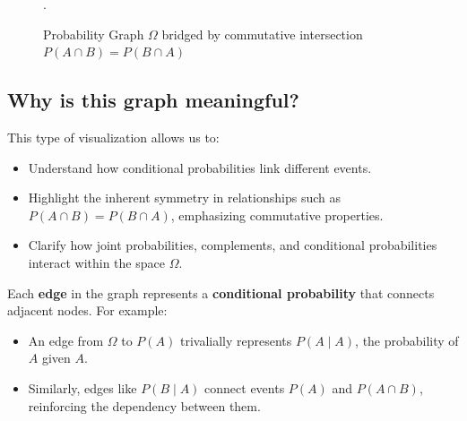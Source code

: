\documentclass[
  12 pt,
  a4paper,
]{book}
\providecommand{\tightlist}{%
  \setlength{\itemsep}{0pt}\setlength{\parskip}{0pt}}
\numberwithin{equation}{section}
\theoremstyle{plain}      %
\theoremstyle{definition} %
\theoremstyle{remark}     %
\theoremstyle{note}         %
\begin{document}
\begin{figure}[htbp]
{
}
\caption{Probability Graph $\Omega$ bridged by commutative intersection $P(A \cap B) = P(B \cap A)$}.
\label{fig:ProbGraph1-diagram}
\end{figure}

\hypertarget{why-is-this-graph-meaningful}{%
\subsection{Why is this graph
meaningful?}\label{why-is-this-graph-meaningful}}

This type of visualization allows us to:

\begin{itemize}
\tightlist
\item
  Understand how conditional probabilities link different events.
\item
  Highlight the inherent symmetry in relationships such as
  \(P(A \cap B) = P(B \cap A)\), emphasizing commutative properties.
\item
  Clarify how joint probabilities, complements, and conditional
  probabilities interact within the space \(\Omega\).
\end{itemize}

Each \textbf{edge} in the graph represents a \textbf{conditional
probability} that connects adjacent nodes. For example:

\begin{itemize}
\tightlist
\item
  An edge from \(\Omega\) to \(P(A)\) trivalially represents
  \(P(A \mid A)\), the probability of \(A\) given \(A\).
\item
  Similarly, edges like \(P(B \mid A)\) connect events \(P(A)\) and
  \(P(A \cap B)\), reinforcing the dependency between them.
\end{itemize}
\end{document}
